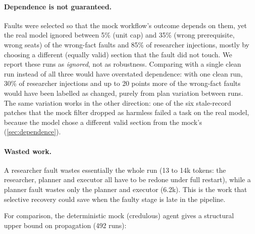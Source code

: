 \documentclass[11pt]{article}
\begin{document}
\paragraph{Dependence is not guaranteed.} Faults were selected so that the
mock workflow's outcome depends on them, yet the real model ignored between
5\% (unit cap) and 35\% (wrong prerequisite, wrong seats) of the wrong-fact
faults and 85\% of researcher injections, mostly by choosing a different
(equally valid) section that the fault did not touch. We report these runs as
\emph{ignored}, not as robustness. Comparing with a single clean run instead
of all three would have overstated dependence: with one clean run, 30\% of
researcher injections and up to 20 points more of the wrong-fact faults would
have been labelled as changed, purely from plan variation between runs.
The same variation works in the other direction: one of the six stale-record
patches that the mock filter dropped as harmless failed a task on the real
model, because the model chose a different valid section from the mock's
(\cref{sec:dependence}).

\paragraph{Wasted work.} A researcher fault wastes essentially the whole run
(13 to 14k tokens: the researcher, planner and executor all have to be redone
under full restart), while a planner fault wastes only the planner and
executor (6.2k). This is the work that selective recovery could save when
the faulty stage is late in the pipeline.

For comparison, the deterministic mock (credulous) agent gives a structural
upper bound on propagation (492 runs):
\begin{table}[h]
\centering\small
{}
\caption{Mock (credulous) agents: how far each fault \emph{can} propagate
through the workflow's structure.}
\label{tab:mock}
\end{table}
\end{document}
